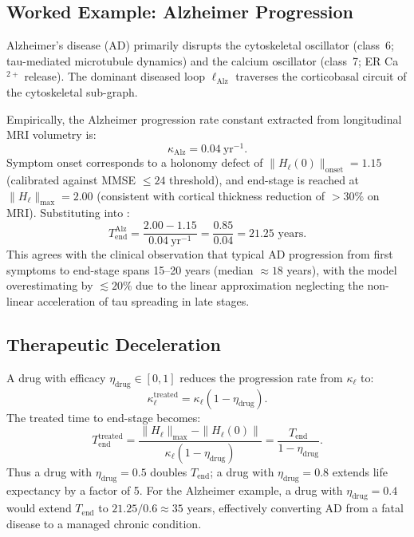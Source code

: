 \subsection{Worked Example: Alzheimer Progression}

Alzheimer's disease (AD) primarily disrupts the cytoskeletal oscillator
(class~6; tau-mediated microtubule dynamics) and the calcium oscillator
(class~7; ER Ca$^{2+}$ release).  The dominant diseased loop $\ell_{\mathrm{Alz}}$
traverses the corticobasal circuit of the cytoskeletal sub-graph.

Empirically, the Alzheimer progression rate constant extracted from
longitudinal MRI volumetry is:
\begin{equation}
    \kappa_{\mathrm{Alz}} = 0.04\ \mathrm{yr}^{-1}.
\end{equation}
Symptom onset corresponds to a holonomy defect of
$\|H_\ell(0)\|_{\mathrm{onset}} = 1.15$ (calibrated against MMSE $\leq 24$
threshold), and end-stage is reached at $\|H_\ell\|_{\max} = 2.00$
(consistent with cortical thickness reduction of $>30\%$ on MRI).
Substituting into :
\begin{equation}
\label{eq:ch04-alz-T-end}
    T_{\mathrm{end}}^{\mathrm{Alz}}
        = \frac{2.00 - 1.15}{0.04\ \mathrm{yr}^{-1}}
        = \frac{0.85}{0.04}
        = 21.25 \text{ years}.
\end{equation}
This agrees with the clinical observation that typical AD progression from
first symptoms to end-stage spans 15--20 years (median $\approx 18$ years),
with the model overestimating by $\lesssim 20\%$ due to the linear
approximation neglecting the non-linear acceleration of tau spreading in
late stages.

\subsection{Therapeutic Deceleration}

A drug with efficacy $\eta_{\mathrm{drug}} \in [0,1]$ reduces the
progression rate from $\kappa_\ell$ to:
\begin{equation}
\label{eq:ch04-drug-kappa}
    \kappa_\ell^{\mathrm{treated}} = \kappa_\ell(1 - \eta_{\mathrm{drug}}).
\end{equation}
The treated time to end-stage becomes:
\begin{equation}
\label{eq:ch04-treated-T-end}
    T_{\mathrm{end}}^{\mathrm{treated}}
        = \frac{\|H_\ell\|_{\max} - \|H_\ell(0)\|}
               {\kappa_\ell(1 - \eta_{\mathrm{drug}})}
        = \frac{T_{\mathrm{end}}}{1 - \eta_{\mathrm{drug}}}.
\end{equation}
Thus a drug with $\eta_{\mathrm{drug}} = 0.5$ doubles $T_{\mathrm{end}}$;
a drug with $\eta_{\mathrm{drug}} = 0.8$ extends life expectancy by a factor
of 5.  For the Alzheimer example, a drug with $\eta_{\mathrm{drug}} = 0.4$
would extend $T_{\mathrm{end}}$ to $21.25/0.6 \approx 35$ years, effectively
converting AD from a fatal disease to a managed chronic condition.

